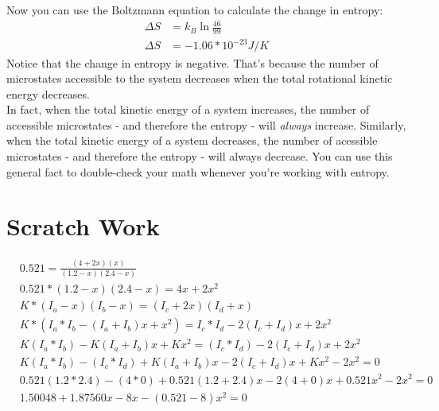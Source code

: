 \documentclass{article}  %
\begin{document}
Now you can use the Boltzmann equation to calculate the change in entropy:
\begin{equation*}
    \begin{aligned}
        \Delta S &= k_B \ln \frac{46}{99} \\
        \Delta S &= -1.06 * 10^{-23} J/K
    \end{aligned}
\end{equation*}
Notice that the change in entropy is negative. That's because the number of microstates accessible to the system decreases when the total rotational kinetic energy decreases. \\
In fact, when the total kinetic energy of a system increases, the number of accessible microstates - and therefore the entropy - will \emph{always} increase. Similarly, when the total kinetic energy of a system decreases, the number of acessible microstates - and therefore the entropy - will always decrease. You can use this general fact to double-check your math whenever you're working with entropy.







\newpage
\section*{Scratch Work}

\begin{equation*}
    \begin{aligned}
        &0.521 = \frac{(4+2x)(x)}{(1.2-x)(2.4-x)} \\
        &0.521 * (1.2-x)(2.4-x) = 4x+ 2x^2 \\ 
        &K * (I_a - x)(I_b - x) = (I_c + 2x)(I_d + x)\\
        &K * (I_a* I_b - (I_a + I_b)x + x^2) = I_c* I_d - 2(I_c + I_d)x + 2x^2 \\
        &K(I_a* I_b) - K(I_a + I_b)x + Kx^2 = (I_c* I_d) - 2(I_c + I_d)x + 2x^2 \\
        &K(I_a* I_b) - (I_c* I_d) + K(I_a + I_b)x - 2(I_c + I_d)x + Kx^2 - 2x^2 = 0 \\
        &0.521(1.2*2.4) - (4*0) + 0.521(1.2 + 2.4)x - 2(4+0)x + 0.521x^2 - 2x^2 = 0 \\
        &1.50048 + 1.87560x - 8x - (0.521-8)x^2 = 0
    \end{aligned}
\end{equation*}
\end{document}
